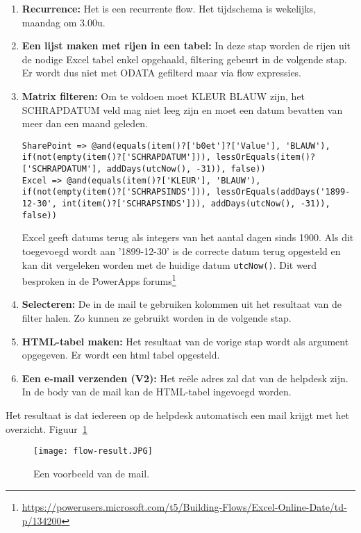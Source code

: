 \begin{enumerate}
    \item \textbf{Recurrence:} Het is een recurrente flow. Het tijdschema is wekelijks, maandag om 3.00u.
    \item \textbf{Een lijst maken met rijen in een tabel:} In deze stap worden de rijen uit de nodige Excel tabel enkel opgehaald, filtering gebeurt in de volgende stap. Er wordt dus niet met ODATA gefilterd maar via flow expressies.
    \item \textbf{Matrix filteren:} Om te voldoen moet KLEUR BLAUW zijn, het SCHRAPDATUM veld mag niet leeg zijn en moet een datum bevatten van meer dan een maand geleden.
\begin{lstlisting}
SharePoint => @and(equals(item()?['b0et']?['Value'], 'BLAUW'), if(not(empty(item()?['SCHRAPDATUM'])), lessOrEquals(item()?['SCHRAPDATUM'], addDays(utcNow(), -31)), false))
Excel => @and(equals(item()?['KLEUR'], 'BLAUW'), if(not(empty(item()?['SCHRAPSINDS'])), lessOrEquals(addDays('1899-12-30', int(item()?['SCHRAPSINDS'])), addDays(utcNow(), -31)), false))
\end{lstlisting}
    Excel geeft datums terug als integers van het aantal dagen sinds 1900. Als dit toegevoegd wordt aan '1899-12-30' is de correcte datum terug opgesteld en kan dit vergeleken worden met de huidige datum \lstinline|utcNow()|. Dit werd besproken in de PowerApps forums\footnote{\url{https://powerusers.microsoft.com/t5/Building-Flows/Excel-Online-Date/td-p/134200}}
    \item \textbf{Selecteren:} De in de mail te gebruiken kolommen uit het resultaat van de filter halen. Zo kunnen ze gebruikt worden in de volgende stap.
    \item \textbf{HTML-tabel maken:} Het resultaat van de vorige stap wordt als argument opgegeven. Er wordt een html tabel opgesteld.
    \item \textbf{Een e-mail verzenden (V2):} Het reële adres zal dat van de helpdesk zijn. In de body van de mail kan de HTML-tabel ingevoegd worden.
\end{enumerate}

Het resultaat is dat iedereen op de helpdesk automatisch een mail krijgt met het overzicht. Figuur~\ref{fig:flow-result}

\begin{figure}[h!]
    \texttt{[image: flow-result.JPG]}
    \caption{Een voorbeeld van de mail.}
    \label{fig:flow-result}
\end{figure}

